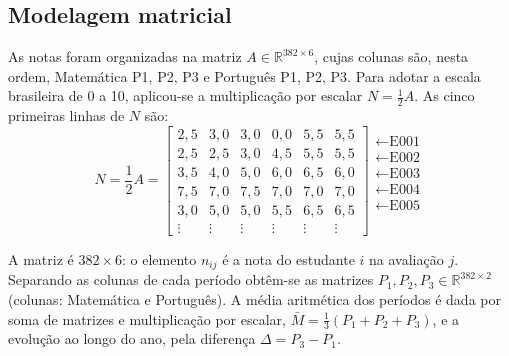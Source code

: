 \documentclass[12pt,a4paper]{article}
\newcommand{\R}{\mathbb{R}}
\begin{document}
\subsection{Modelagem matricial}

As notas foram organizadas na matriz $A\in\R^{382\times 6}$, cujas colunas são, nesta ordem, Matemática P1, P2, P3 e Português P1, P2, P3. Para adotar a escala brasileira de 0 a 10, aplicou-se a multiplicação por escalar $N=\tfrac{1}{2}A$. As cinco primeiras linhas de $N$ são:
\begin{equation}
N=\frac{1}{2}A=
\begin{bmatrix}
2{,}5 & 3{,}0 & 3{,}0 & 0{,}0 & 5{,}5 & 5{,}5\\
2{,}5 & 2{,}5 & 3{,}0 & 4{,}5 & 5{,}5 & 5{,}5\\
3{,}5 & 4{,}0 & 5{,}0 & 6{,}0 & 6{,}5 & 6{,}0\\
7{,}5 & 7{,}0 & 7{,}5 & 7{,}0 & 7{,}0 & 7{,}0\\
3{,}0 & 5{,}0 & 5{,}0 & 5{,}5 & 6{,}5 & 6{,}5\\
\vdots & \vdots & \vdots & \vdots & \vdots & \vdots
\end{bmatrix}
\begin{matrix}\leftarrow \text{E001}\\ \leftarrow \text{E002}\\ \leftarrow \text{E003}\\ \leftarrow \text{E004}\\ \leftarrow \text{E005}\\ \phantom{\vdots}\end{matrix}
\label{eq:N}
\end{equation}

A matriz é $382\times 6$: o elemento $n_{ij}$ é a nota do estudante $i$ na avaliação $j$. Separando as colunas de cada período obtêm-se as matrizes $P_1,P_2,P_3\in\R^{382\times 2}$ (colunas: Matemática e Português). A média aritmética dos períodos é dada por soma de matrizes e multiplicação por escalar, $\bar{M}=\tfrac{1}{3}(P_1+P_2+P_3)$, e a evolução ao longo do ano, pela diferença $\Delta=P_3-P_1$.
\end{document}
